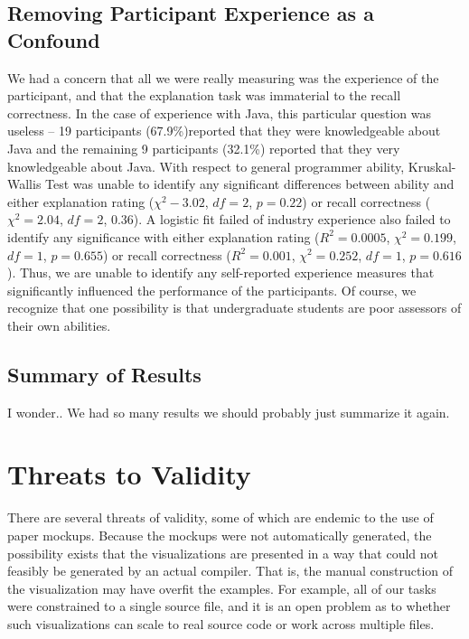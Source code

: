 \documentclass[conference]{IEEEtran}
\begin{document}
\subsection{Removing Participant Experience as a Confound}

We had a concern that all we were really measuring was the experience of the participant, and that the explanation task was immaterial to the recall correctness. In the case of experience with Java, this particular question was useless -- 19 participants (67.9\%)reported that they were knowledgeable about Java and the remaining 9 participants (32.1\%) reported that they very knowledgeable about Java. With respect to general programmer ability, Kruskal-Wallis Test was unable to identify any significant differences between ability and either explanation rating ($\chi^2 - 3.02$, $df = 2$, $p = 0.22$) or recall correctness ($\chi^2 = 2.04$, $df = 2$, $0.36$). A logistic fit failed of industry experience also failed to identify any significance with either explanation rating ($R^2 = 0.0005$, $\chi^2 = 0.199$, $df = 1$, $p = 0.655$) or recall correctness ($R^2 = 0.001$, $\chi^2 = 0.252$, $df = 1$, $p = 0.616$). Thus, we are unable to identify any self-reported experience measures that significantly influenced the performance of the participants. Of course, we recognize that one possibility is that undergraduate students are poor assessors of their own abilities.

\subsection{Summary of Results}

I wonder.. We had so many results we should probably just summarize it again.

\section{Threats to Validity}
\label{sec:threats}

There are several threats of validity, some of which are endemic to the use of paper mockups. Because the mockups were not automatically generated, the possibility exists that the visualizations are presented in a way that could not feasibly be generated by an actual compiler. That is, the manual construction of the visualization may have overfit the examples. For example, all of our tasks were constrained to a single source file, and it is an open problem as to whether such visualizations can scale to real source code or work across multiple files. 
\end{document}
